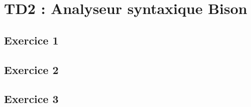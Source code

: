 \chapter{TD2 : Analyseur syntaxique Bison}

\section{Exercice 1}


\section{Exercice 2}


\section{Exercice 3}



